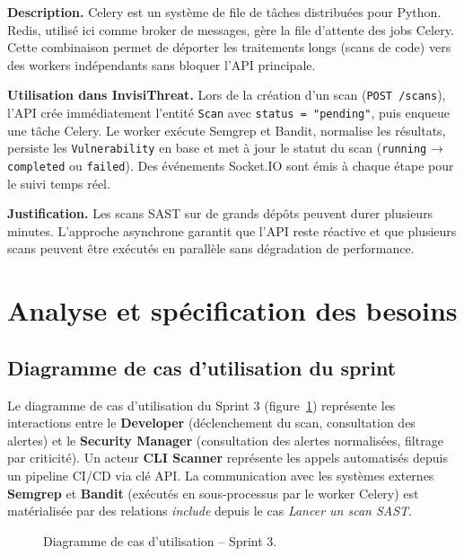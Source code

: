 \textbf{Description.} Celery est un système de file de tâches distribuées pour Python. Redis, utilisé ici comme broker de messages, gère la file d'attente des jobs Celery. Cette combinaison permet de déporter les traitements longs (scans de code) vers des workers indépendants sans bloquer l'API principale.

\textbf{Utilisation dans InvisiThreat.} Lors de la création d'un scan (\texttt{POST /scans}), l'API crée immédiatement l'entité \texttt{Scan} avec \texttt{status = "pending"}, puis enqueue une tâche Celery. Le worker exécute Semgrep et Bandit, normalise les résultats, persiste les \texttt{Vulnerability} en base et met à jour le statut du scan (\texttt{running} → \texttt{completed} ou \texttt{failed}). Des événements Socket.IO sont émis à chaque étape pour le suivi temps réel.

\textbf{Justification.} Les scans SAST sur de grands dépôts peuvent durer plusieurs minutes. L'approche asynchrone garantit que l'API reste réactive et que plusieurs scans peuvent être exécutés en parallèle sans dégradation de performance.

\section{Analyse et spécification des besoins}

\subsection{Diagramme de cas d'utilisation du sprint}

Le diagramme de cas d'utilisation du Sprint 3 (figure~\ref{fig:sprint3-use-case}) représente les interactions entre le \textbf{Developer} (déclenchement du scan, consultation des alertes) et le \textbf{Security Manager} (consultation des alertes normalisées, filtrage par criticité). Un acteur \textbf{CLI Scanner} représente les appels automatisés depuis un pipeline CI/CD via clé API. La communication avec les systèmes externes \textbf{Semgrep} et \textbf{Bandit} (exécutés en sous-processus par le worker Celery) est matérialisée par des relations \textit{include} depuis le cas \textit{Lancer un scan SAST}.

\begin{figure}[H]
\centering
\fbox{\rule{0pt}{2in}\rule{0.9\linewidth}{0pt}}
\caption{Diagramme de cas d'utilisation -- Sprint 3.}
\label{fig:sprint3-use-case}
\end{figure}

